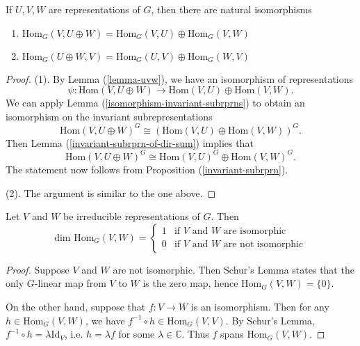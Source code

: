 \begin{cor}\label{invariant-subrprns-hom-spaces}
If  $U, V, W$ are representations of $G$, then there are natural isomorphisms
\begin{enumerate}
\item $\text{Hom}_G(V, U \oplus W) = \text{Hom}_G(V,U) \oplus \text{Hom}_G(V,W)$
\item $\text{Hom}_G(U \oplus W, V) = \text{Hom}_G(U, V) \oplus \text{Hom}_G(W ,V)$
\end{enumerate}
\end{cor}
\begin{proof}
(1). By Lemma (\ref{lemma-uvw}), we have an isomorphism of representations 
\[ \psi \colon \text{Hom}(V, U \oplus W) \to \text{Hom}(V, U) \oplus \text{Hom}(V,W). \]
We can apply Lemma (\ref{isomorphism-invariant-subrprns}) to obtain an isomorphism on the invariant subrepresentations
\[\text{Hom}(V, U \oplus W)^G \cong (\text{Hom}(V, U) \oplus \text{Hom}(V,W))^G.\]
Then Lemma (\ref{invariant-subrprn-of-dir-sum}) implies that 
\[\text{Hom}(V, U \oplus W)^G \cong \text{Hom}(V, U)^G \oplus \text{Hom}(V,W)^G. \]
The statement now follows from Proposition (\ref{invariant-subrprn}).

(2). The argument is similar to the one above.
\end{proof}

\begin{prop}\label{schurs-lemma-homvw}
Let $V$ and $W$ be irreducible representations of $G$.  Then
\[ \text{dim Hom}_G (V,W) =  \begin{cases} 
1 & \mbox{if $V$ and $W$ are isomorphic}  \\
0 &\mbox{if $V$ and $W$ are not isomorphic}
\end{cases} \]
\end{prop}
\begin{proof}
Suppose $V$ and $W$ are not isomorphic.  Then Schur's Lemma states that the only $G$-linear map from $V$ to $W$ is the zero map, hence $\text{Hom}_G(V,W) = \{ 0 \} $.

On the other hand, suppose that $f \colon V \to W$ is an isomorphism.  Then for any $h \in \text{Hom}_G(V,W)$, we have $f^{-1} \circ h \in \text{Hom}_G(V,V)$.  By Schur's Lemma, $f^{-1} \circ h = \lambda \text{Id}_V$, i.e. $h = \lambda f$ for some $\lambda \in \mathbb{C}$.  Thus $f$  spans $\text{Hom}_G(V,W)$.
\end{proof}


